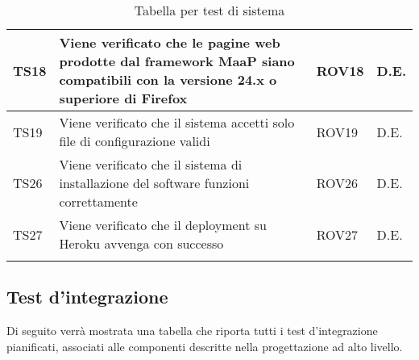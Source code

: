\begin{center}
\begin{longtable}{|p{2cm}|p{7cm}|p{2cm}|p{2cm}|}
\midrule
TS18 & Viene verificato che le pagine web prodotte dal framework MaaP siano compatibili con la versione 24.x o superiore di Firefox & ROV18 & D.E.\\
\midrule
TS19 & Viene verificato che il sistema accetti solo file di configurazione validi & ROV19 & D.E.\\
\midrule
TS26 & Viene verificato che il sistema di installazione del software funzioni correttamente & ROV26 & D.E.\\
\midrule
TS27 & Viene verificato che il deployment su Heroku avvenga con successo & ROV27 & D.E.\\
\bottomrule
\caption{Tabella per test di sistema}
\label{tab:changelog}
\end{longtable}
\end{center}
\subsection{Test d'integrazione}
Di seguito verrà mostrata una tabella che riporta tutti i test d'integrazione pianificati, associati alle componenti descritte nella progettazione ad alto livello.\\
